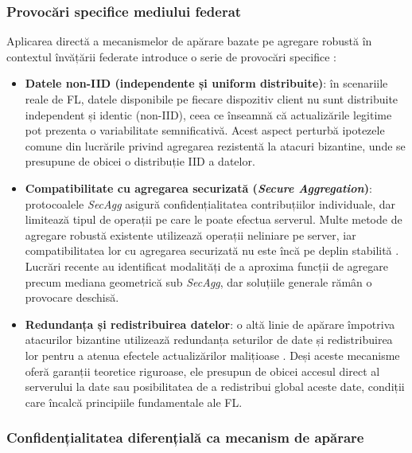\documentclass[../../main.tex]{subfiles}
\begin{document}
    \subsubsection{Provocări specifice mediului federat}

    Aplicarea directă a mecanismelor de apărare bazate pe agregare robustă în contextul învățării federate introduce o serie de provocări specifice \cite{kairouz2021federated}:

    \begin{itemize}
        \item \textbf{Datele non-IID (independente și uniform distribuite)}: în scenariile reale de FL, datele disponibile pe fiecare dispozitiv client nu sunt distribuite independent și identic (non-IID), ceea ce înseamnă că actualizările legitime pot prezenta o variabilitate semnificativă. Acest aspect perturbă ipotezele comune din lucrările privind agregarea rezistentă la atacuri bizantine, unde se presupune de obicei o distribuție IID a datelor.

        \item \textbf{Compatibilitate cu agregarea securizată (\textit{Secure Aggregation})}: protocoalele \textit{SecAgg} asigură confidențialitatea contribuțiilor individuale, dar limitează tipul de operații pe care le poate efectua serverul. Multe metode de agregare robustă existente utilizează operații neliniare pe server, iar compatibilitatea lor cu agregarea securizată nu este încă pe deplin stabilită \cite{kairouz2021federated}. Lucrări recente au identificat modalități de a aproxima funcții de agregare precum mediana geometrică sub \textit{SecAgg}, dar soluțiile generale rămân o provocare deschisă.

        \item \textbf{Redundanța și redistribuirea datelor}: o altă linie de apărare împotriva atacurilor bizantine utilizează redundanța seturilor de date și redistribuirea lor pentru a atenua efectele actualizărilor malițioase \cite{chen2018draco}. Deși aceste mecanisme oferă garanții teoretice riguroase, ele presupun de obicei accesul direct al serverului la date sau posibilitatea de a redistribui global aceste date, condiții care încalcă principiile fundamentale ale FL.
    \end{itemize}

    \subsubsection{Confidențialitatea diferențială ca mecanism de apărare}
\end{document}
